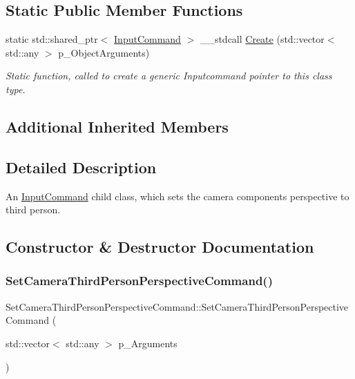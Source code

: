 \subsection*{Static Public Member Functions}
\begin{DoxyCompactItemize}
\item 
static std\+::shared\+\_\+ptr$<$ \mbox{\hyperlink{class_input_command}{Input\+Command}} $>$ \+\_\+\+\_\+stdcall \mbox{\hyperlink{class_set_camera_third_person_perspective_command_a5fddf3048c322ace2bb78a63318aa10f}{Create}} (std\+::vector$<$ std\+::any $>$ p\+\_\+\+Object\+Arguments)
\begin{DoxyCompactList}\small\item\em Static function, called to create a generic Inputcommand pointer to this class type. \end{DoxyCompactList}\end{DoxyCompactItemize}
\subsection*{Additional Inherited Members}


\subsection{Detailed Description}
An \mbox{\hyperlink{class_input_command}{Input\+Command}} child class, which sets the camera component\textquotesingle{}s perspective to third person. 

\subsection{Constructor \& Destructor Documentation}
\mbox{\label{class_set_camera_third_person_perspective_command_a630486c044c16140e45c67b3b382912c}} 
\subsubsection{\texorpdfstring{SetCameraThirdPersonPerspectiveCommand()}{SetCameraThirdPersonPerspectiveCommand()}}
{\footnotesize\ttfamily Set\+Camera\+Third\+Person\+Perspective\+Command\+::\+Set\+Camera\+Third\+Person\+Perspective\+Command (\begin{DoxyParamCaption}\item[{std\+::vector$<$ std\+::any $>$}]{p\+\_\+\+Arguments }\end{DoxyParamCaption})\hspace{0.3cm}{\ttfamily [inline]}}



